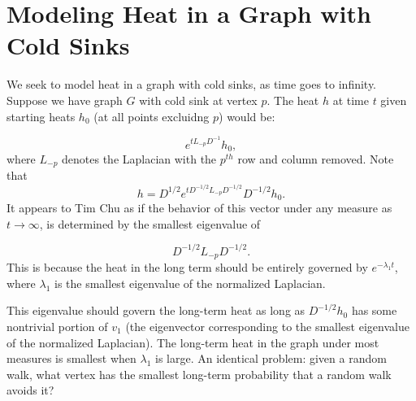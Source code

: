 \section{Modeling Heat in a Graph  with Cold Sinks}
We seek to model heat in a graph with cold sinks,
as time goes to infinity. Suppose we have graph $G$ with cold
sink at vertex $p$.
The heat $h$ at time $t$ given starting heats $h_0$ (at all
    points excluidng $p$) would be:

\[e^{t L_{-p} D^{-1}} h_0,\]
where $L_{-p}$ denotes the Laplacian with the $p^{th}$ row
and column removed. Note that
\[h = D^{1/2} e^{t D^{-1/2}L_{-p}D^{-1/2}} D^{-1/2}
h_0. \]
It appears to Tim Chu as if the behavior of this vector under any
measure as $t \rightarrow
\infty$, is determined by the smallest eigenvalue of 

\[ D^{-1/2} L_{-p} D^{-1/2}. \]
This is because the heat in the long term should be
entirely governed by $e^{-\lambda_1 t}$, where $\lambda_1$ is the
smallest eigenvalue of the normalized Laplacian. 

This eigenvalue
should govern the long-term heat as
long as $D^{-1/2} h_0$ has some nontrivial portion of $v_1$ (the
eigenvector corresponding to the smallest eigenvalue of the
normalized Laplacian). 
The long-term
heat in the graph under most measures is smallest when
$\lambda_1$ is large.  
An identical problem: given a
random walk, what vertex has the smallest long-term probability
that a random walk avoids it?


